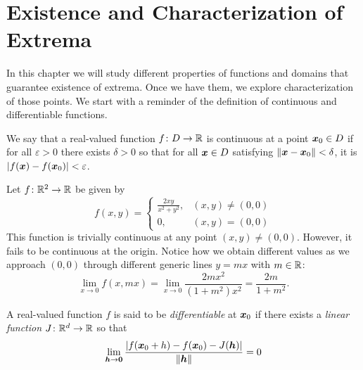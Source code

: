 
\chapter{Existence and Characterization of Extrema}\label{chapter:existenceCharacterization}

In this chapter we will study different properties of functions and domains that guarantee existence of extrema. Once we have them, we explore characterization of those points.  We start with a reminder of the definition of continuous and differentiable functions.

\begin{definition}\label{def:continuous}
We say that a real-valued function $f\colon D \to \mathbb{R}$ is continuous at a point $\boldsymbol{x}_0 \in D$ if for all $\varepsilon > 0$ there exists $\delta > 0$ so that for all $\boldsymbol{x} \in D$ satisfying $\lVert \boldsymbol{x}-\boldsymbol{x}_0 \rVert<\delta$, it is $\lvert  f(\boldsymbol{x}) - f(\boldsymbol{x}_0)  \rvert < \varepsilon$.  
\end{definition}

\begin{example}
Let $f\colon \mathbb{R}^2 \to \mathbb{R}$ be given by
\begin{equation*}
f(x,y) = \begin{cases}
\frac{2xy}{x^2+y^2}, &(x,y) \neq (0,0) \\
0, &(x,y)=(0,0)
\end{cases}
\end{equation*}
This function is trivially continuous at any point $(x,y)\neq(0,0)$.  However, it fails to be continuous at the origin.  Notice how we obtain different values as we approach $(0,0)$ through different generic lines $y=mx$ with $m \in \mathbb{R}$:
\begin{equation*}
\lim_{x\to 0} f(x,mx) = \lim_{x \to 0} \frac{2mx^2}{(1+m^2)x^2} = \frac{2m}{1+m^2}.
\end{equation*}
\end{example}

\begin{definition}\label{def:differentiable}
A real-valued function $f$ is said to be \emph{differentiable} at $\boldsymbol{x}_0$ if there exists a \emph{linear function} $J\colon \mathbb{R}^d \to \mathbb{R}$ so that 
\begin{equation*}
\lim_{\boldsymbol{h} \to \boldsymbol{0}} \frac{\lvert f(\boldsymbol{x}_0+h)-f(\boldsymbol{x}_0)-J(\boldsymbol{h}) \rvert}{\lVert \boldsymbol{h} \rVert} = 0
\end{equation*}
\end{definition}

